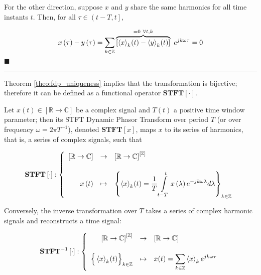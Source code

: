 	For the other direction, suppose $x$ and $y$ share the same harmonics for all time instants $t$. Then, for all $\tau\in\left(t-T,t\right]$,

\begin{equation}
        x\left(\tau\right) - y\left(\tau\right) = \sum\limits_{k\in\mathbb{Z}} \overbrace{\left[\left\langle x \right\rangle_k\hspace{-0.5mm} \left(t\right) - \left\langle y \right\rangle_k\hspace{-0.5mm} \left(t\right)\right]}^{=0\ \forall t,k}\ e^{jk\omega\tau} = 0
\end{equation}
        \hfill$\blacksquare$
\vspace{5mm}
\hrule
\vspace{5mm}

	Theorem \ref{theo:fdp_uniqueness} implies that the transformation is bijective; therefore it can be defined as a functional operator $\mathbf{STFT}\left[\cdot\right]$.

\begin{definition}%
	Let $x(t)\in\left[\mathbb{R}\to\mathbb{C}\right]$ be a complex signal and $T(t)$ a positive time window parameter; then its STFT Dynamic Phasor Transform over period $T$ (or over frequency $\omega = 2\pi T^{-1}$), denoted $\mathbf{STFT}\left[x\right]$, maps $x$ to its series of harmonics, that is, a series of complex signals, such that

\begin{equation}
        \mathbf{STFT}\left[\cdot\right]: \left\{\begin{array}{rcl}
	\left[\mathbb{R}\to\mathbb{C}\right] &\to& \left[\mathbb{R}\to\mathbb{C}\right]^{\left[\mathbb{Z}\right]} \\[5mm]
%
        x\left(t\right) &\mapsto& \left\{ \left\langle x \right\rangle_k\hspace{-0.5mm}\left(t\right) = \displaystyle\dfrac{1}{T}\int\limits_{t-T}^{t}x\left(\lambda\right) e^{-jk\omega\lambda}d\lambda\right\}_{k\in\mathbb{Z}}
\end{array}\right.
\end{equation}

        Conversely, the inverse transformation over $T$ takes a series of complex harmonic signals and reconstructs a time signal:

\begin{equation}
        \mathbf{STFT}^{-1}\left[\cdot\right]: \left\{\begin{array}{rcl}
	\left[\mathbb{R}\to\mathbb{C}\right]^{\left[\mathbb{Z}\right]} &\to& \left[\mathbb{R}\to\mathbb{C}\right] \\[5mm]
%
        \left\{\raisebox{4mm}{} \left\langle x \right\rangle_k\hspace{-0.5mm}\left(t\right) \right\}_{k\in\mathbb{Z}} &\mapsto& x(t) = \displaystyle\sum\limits_{k\in\mathbb{Z}} \left\langle x \right\rangle_k e^{jk\omega\tau}
\end{array}\right. \label{def:inverse_fdp}
\end{equation}

\end{definition} %

